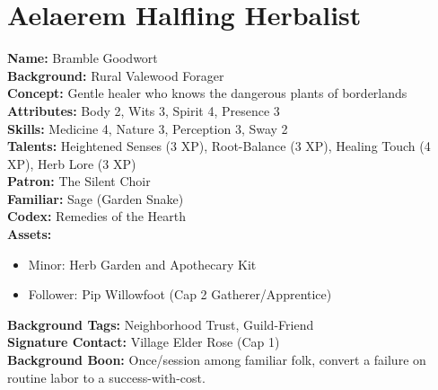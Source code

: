 \documentclass[11pt]{article}
\begin{document}
\section{Aelaerem Halfling Herbalist}
\textbf{Name:} Bramble Goodwort \\
\textbf{Background:} Rural Valewood Forager \\
\textbf{Concept:} Gentle healer who knows the dangerous plants of borderlands \\
\textbf{Attributes:} Body 2, Wits 3, Spirit 4, Presence 3 \\
\textbf{Skills:} Medicine 4, Nature 3, Perception 3, Sway 2 \\
\textbf{Talents:} Heightened Senses (3 XP), Root-Balance (3 XP), Healing Touch (4 XP), Herb Lore (3 XP) \\
\textbf{Patron:} The Silent Choir \\
\textbf{Familiar:} Sage (Garden Snake) \\
\textbf{Codex:} Remedies of the Hearth \\
\textbf{Assets:}
\begin{itemize}
    \item Minor: Herb Garden and Apothecary Kit
    \item Follower: Pip Willowfoot (Cap 2 Gatherer/Apprentice)
\end{itemize}
\textbf{Background Tags:} Neighborhood Trust, Guild-Friend \\
\textbf{Signature Contact:} Village Elder Rose (Cap 1) \\
\textbf{Background Boon:} Once/session among familiar folk, convert a failure on routine labor to a success-with-cost.
\end{document}

